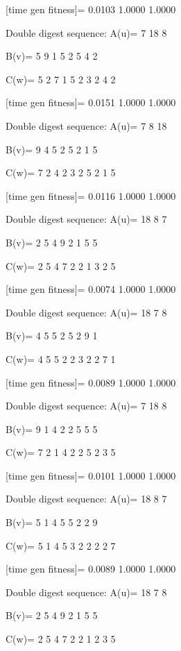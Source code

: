 [time gen fitness]=
    0.0103    1.0000    1.0000

Double digest sequence:
A(u)=
     7    18     8

B(v)=
     5     9     1     5     2     5     4     2

C(w)=
     5     2     7     1     5     2     3     2     4     2

[time gen fitness]=
    0.0151    1.0000    1.0000

Double digest sequence:
A(u)=
     7     8    18

B(v)=
     9     4     5     2     5     2     1     5

C(w)=
     7     2     4     2     3     2     5     2     1     5

[time gen fitness]=
    0.0116    1.0000    1.0000

Double digest sequence:
A(u)=
    18     8     7

B(v)=
     2     5     4     9     2     1     5     5

C(w)=
     2     5     4     7     2     2     1     3     2     5

[time gen fitness]=
    0.0074    1.0000    1.0000

Double digest sequence:
A(u)=
    18     7     8

B(v)=
     4     5     5     2     5     2     9     1

C(w)=
     4     5     5     2     2     3     2     2     7     1

[time gen fitness]=
    0.0089    1.0000    1.0000

Double digest sequence:
A(u)=
     7    18     8

B(v)=
     9     1     4     2     2     5     5     5

C(w)=
     7     2     1     4     2     2     5     2     3     5

[time gen fitness]=
    0.0101    1.0000    1.0000

Double digest sequence:
A(u)=
    18     8     7

B(v)=
     5     1     4     5     5     2     2     9

C(w)=
     5     1     4     5     3     2     2     2     2     7

[time gen fitness]=
    0.0089    1.0000    1.0000

Double digest sequence:
A(u)=
    18     7     8

B(v)=
     2     5     4     9     2     1     5     5

C(w)=
     2     5     4     7     2     2     1     2     3     5

